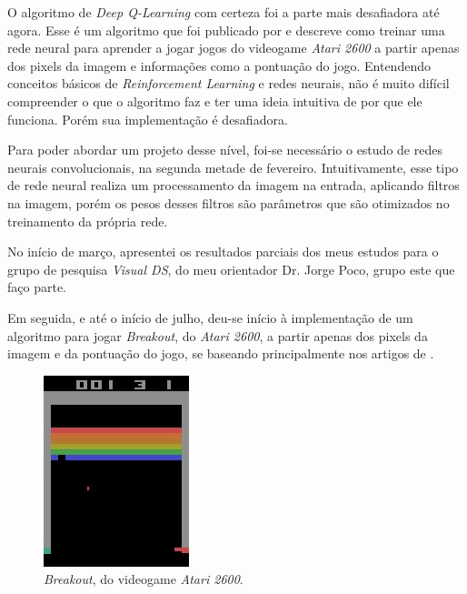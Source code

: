 \documentclass{article}
\begin{document}
        O algoritmo de \textit{Deep Q-Learning} com certeza foi a parte mais desafiadora
        até agora. Esse é um algoritmo que foi publicado por
        e descreve como treinar uma rede neural para aprender a jogar
        jogos do videogame \textit{Atari 2600} a partir apenas dos pixels da imagem e informações
        como a pontuação do jogo.
        Entendendo conceitos básicos de \textit{Reinforcement Learning} e redes neurais,
        não é muito difícil compreender o que o algoritmo faz e ter uma ideia 
        intuitiva de por que ele funciona. Porém sua implementação é desafiadora.

        Para poder abordar um projeto desse nível, foi-se necessário o estudo
        de redes neurais convolucionais, na segunda metade de fevereiro. Intuitivamente,
        esse tipo de rede neural
        realiza um processamento da imagem na entrada, aplicando filtros na imagem, porém 
        os pesos desses filtros são parâmetros que são otimizados no treinamento
        da própria rede.

        No início de março, apresentei
        os resultados parciais dos meus 
        estudos para o grupo de pesquisa \textit{Visual DS}, do meu orientador
        Dr. Jorge Poco, grupo este que faço parte.

        Em seguida, e até o início de julho, deu-se início à implementação de um algoritmo para jogar
        \textit{Breakout}, do \textit{Atari 2600}, a partir apenas dos pixels da imagem
        e da pontuação do jogo,
        se baseando principalmente nos artigos de
        .

        \begin{figure}[h!]
            \centering
            \includegraphics[]{breakout.jpg}
            \caption{\textit{Breakout}, do videogame \textit{Atari 2600}.}
            \label{fig:breakout}
        \end{figure}
\end{document}
